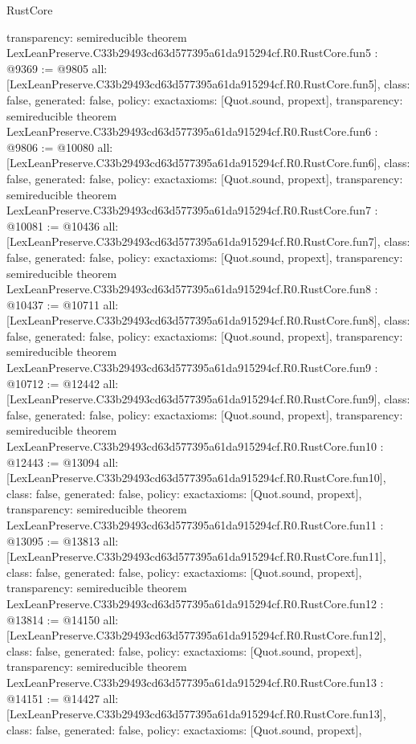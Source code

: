 \begin{lexlean}{RustCore}
\begin{coremodule}
{  transparency: semireducible
}
theorem LexLeanPreserve.C33b29493cd63d577395a61da915294cf.R0.RustCore.fun5 : @9369 := @9805 {
  all: [LexLeanPreserve.C33b29493cd63d577395a61da915294cf.R0.RustCore.fun5],
  class: false,
  generated: false,
  policy: exact{axioms: [Quot.sound, propext]},
  transparency: semireducible
}
theorem LexLeanPreserve.C33b29493cd63d577395a61da915294cf.R0.RustCore.fun6 : @9806 := @10080 {
  all: [LexLeanPreserve.C33b29493cd63d577395a61da915294cf.R0.RustCore.fun6],
  class: false,
  generated: false,
  policy: exact{axioms: [Quot.sound, propext]},
  transparency: semireducible
}
theorem LexLeanPreserve.C33b29493cd63d577395a61da915294cf.R0.RustCore.fun7 : @10081 := @10436 {
  all: [LexLeanPreserve.C33b29493cd63d577395a61da915294cf.R0.RustCore.fun7],
  class: false,
  generated: false,
  policy: exact{axioms: [Quot.sound, propext]},
  transparency: semireducible
}
theorem LexLeanPreserve.C33b29493cd63d577395a61da915294cf.R0.RustCore.fun8 : @10437 := @10711 {
  all: [LexLeanPreserve.C33b29493cd63d577395a61da915294cf.R0.RustCore.fun8],
  class: false,
  generated: false,
  policy: exact{axioms: [Quot.sound, propext]},
  transparency: semireducible
}
theorem LexLeanPreserve.C33b29493cd63d577395a61da915294cf.R0.RustCore.fun9 : @10712 := @12442 {
  all: [LexLeanPreserve.C33b29493cd63d577395a61da915294cf.R0.RustCore.fun9],
  class: false,
  generated: false,
  policy: exact{axioms: [Quot.sound, propext]},
  transparency: semireducible
}
theorem LexLeanPreserve.C33b29493cd63d577395a61da915294cf.R0.RustCore.fun10 : @12443 := @13094 {
  all: [LexLeanPreserve.C33b29493cd63d577395a61da915294cf.R0.RustCore.fun10],
  class: false,
  generated: false,
  policy: exact{axioms: [Quot.sound, propext]},
  transparency: semireducible
}
theorem LexLeanPreserve.C33b29493cd63d577395a61da915294cf.R0.RustCore.fun11 : @13095 := @13813 {
  all: [LexLeanPreserve.C33b29493cd63d577395a61da915294cf.R0.RustCore.fun11],
  class: false,
  generated: false,
  policy: exact{axioms: [Quot.sound, propext]},
  transparency: semireducible
}
theorem LexLeanPreserve.C33b29493cd63d577395a61da915294cf.R0.RustCore.fun12 : @13814 := @14150 {
  all: [LexLeanPreserve.C33b29493cd63d577395a61da915294cf.R0.RustCore.fun12],
  class: false,
  generated: false,
  policy: exact{axioms: [Quot.sound, propext]},
  transparency: semireducible
}
theorem LexLeanPreserve.C33b29493cd63d577395a61da915294cf.R0.RustCore.fun13 : @14151 := @14427 {
  all: [LexLeanPreserve.C33b29493cd63d577395a61da915294cf.R0.RustCore.fun13],
  class: false,
  generated: false,
  policy: exact{axioms: [Quot.sound, propext]},
}
\end{coremodule}
\end{lexlean}
